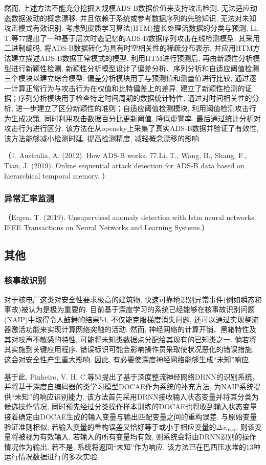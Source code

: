 \documentclass{Style/aas}
\begin{document}
\begin{multicols}{2}
  然而, 上述方法不能充分挖掘大规模ADS-B数据价值来支持攻击检测, 无法适应动态数据波动的概念漂移, 并且依赖于系统或参考数据序列的先验知识, 无法对未知攻击模式有效识别. 考虑到皮质学习算法(HTM)擅长处理流数据的分类与预测, Li, T.等77提出了一种基于层次时态记忆的ADS-B数据序列攻击在线检测模型. 其采用二进制编码, 将ADS-B数据转化为具有时空相关性的稀疏分布表示, 并应用HTM方法建立描述ADS-B数据正常模式的模型. 利用HTM进行预测后, 再由新颖性分析模型进行新颖性检测, 新颖性分析模型设计了偏差分析、序列分析和自适应阈值检测三个模块以建立综合模型: 偏差分析模块用于与预测值和测量值进行比较, 通过逐一计算正常行为与攻击行为在权值和比特偏差上的差异, 建立了新颖性检测的证据；序列分析模块用于检查特定时间周期的数据统计特性, 通过对时间相关性的分析, 进一步建立了区分新颖性的准则；自适应阈值检测模块, 利用阈值检测攻击行为生成决策, 同时利用攻击数据百分比更新阈值, 降低虚警率. 最后通过统计分析对攻击行为进行区分. 该方法在从opensky上采集了真实ADS-B数据并验证了有效性, 该方法能够减小检测时延, 提高检测精度, 减轻概念漂移的影响.

  （1.	Australia, A. (2012). How ADS-B works.
  77.Li, T., Wang, B., Shang, F., Tian, J. (2019). Online sequential attack detection for ADS-B data based on hierarchical temporal memory. ）

  \subsubsection{异常汇率监测}
  （Ergen, T. (2019). Unsupervised anomaly detection with lstm neural networks. IEEE Transactions on Neural Networks and Learning Systems.）

  \subsection{其他}

  \subsubsection{核事故识别}
  对于核电厂这类对安全性要求极高的建筑物, 快速可靠地识别异常事件(例如瞬态和事故)被认为是极为重要的. 目前基于深度学习的系统已经能够在核事故识别问题(NAIP)中取得令人鼓舞的结果54, 不仅能克服梯度消失问题, 还可以通过实现整流器激活功能来实现计算网络突触的活动. 然而, 神经网络的计算开销、黑箱特性及其对噪声不敏感的特性, 可能将未知类数据点分配给其现有的已知类之一. 倘若将其实施到关键应用程序, 错误标识可能会影响操作员采取使状况恶化的错误措施, 这会对安全性产生重大影响. 因此, 有必要使深度神经网络能够生成“未知”响应.

  基于此, Pinheiro, V. H. C.等55提出了基于深度整流神经网络DRNN的识别系统，并将基于深度自编码器的类学习模型DOCAE作为系统的补充方法, 为NAIP系统提供“未知”的响应识别能力. 该方法首先采用DRNN接收输入状态变量并将其分类为候选操作情况, 同时预先经过分类操作样本训练的DOCAE也将收到输入状态变量. 接着确定由DOCAE生成的输入变量与输出匹配变量之间的重构误差. 与原始变量验证准则相似, 若输入变量的重构误差又恰好等于或小于相应变量的$ \varDelta x_{\max} $, 则该变量将被视为有效输入. 若输入的所有变量均有效, 则系统会将由DRNN识别的操作情况作为输出. 若不是, 系统将返回“未知”作为响应. 该方法已在巴西压水堆的13种运行情况数据进行的多次实验.


\end{multicols}
\end{document}

